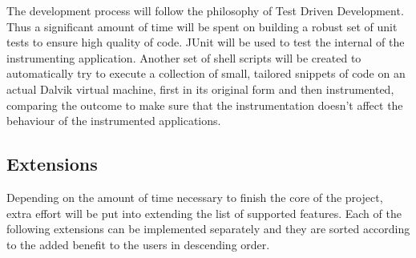 \documentclass[12pt]{article}
\begin{document}
The development process will follow the philosophy of Test Driven 
Development. Thus a significant amount of time will be spent on building 
a robust set of unit tests to ensure high quality of code. JUnit will be 
used to test the internal of the instrumenting application. Another set of 
shell scripts will be created to automatically try to execute a collection
of small, tailored snippets of code on an actual Dalvik virtual machine, 
first in its original form and then instrumented, comparing the outcome
to make sure that the instrumentation doesn't affect the behaviour of 
the instrumented applications.

\subsection*{Extensions}

Depending on the amount of time necessary to finish the core of the project,
extra effort will be put into extending the list of supported features. Each 
of the following extensions can be implemented separately and they are 
sorted according to the added benefit to the users in descending order.
\end{document}
